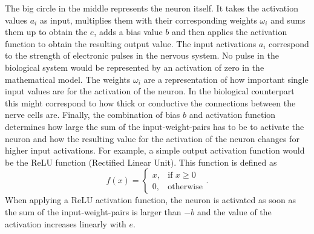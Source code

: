 The big circle in the middle represents the neuron itself. It takes the activation values $a_i$ as input, multiplies them with their corresponding weights $\omega_i$ and sums them up to obtain the $e$, adds a bias value $b$ and then applies the activation function to obtain the resulting output value. The input activations $a_i$ correspond to the strength of electronic pulses in the nervous system. No pulse in the biological system would be represented by an activation of zero in the mathematical model. The weights $\omega_i$ are a representation of how important single input values are for the activation of the neuron. In the biological counterpart this might correspond to how thick or conductive the connections between the nerve cells are. Finally, the combination of bias $b$ and activation function determines how large the sum of the input-weight-pairs has to be to activate the neuron and how the resulting value for the activation of the neuron changes for higher input activations. For example, a simple output activation function would be the ReLU function (Rectified Linear Unit).
This function is defined as 
\begin{equation}
	f(x) = 
	\begin{cases}
		x, &\text{if } x\geq0 \\
		0, &\text{otherwise}
	\end{cases}.
\end{equation} 
When applying a ReLU activation function, the neuron is activated as soon as the sum of the input-weight-pairs is larger than $-b$ and the value of the activation increases linearly with $e$.

